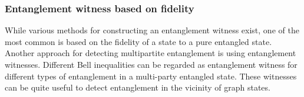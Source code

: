 \documentclass[
reprint,
aps,
pra,
]{revtex4-2}
\theoremstyle{plain}
\theoremstyle{definition}
\newtheorem{remark}{Remark}
\newcommand{\dm}{\rho}
\begin{document}


\subsubsection{Entanglement witness based on fidelity}\label{sec:entanglement_witness}
While various methods for constructing an entanglement witness exist, one of the most common is based on the ﬁdelity of a state to a pure entangled state.
Another approach for detecting multipartite entanglement is using entanglement witnesses.
Different Bell inequalities can be regarded as entanglement witness for different types of entanglement in a multi-party entangled state.
These witnesses can be quite useful to detect entanglement in the vicinity of graph states.

\end{document}
